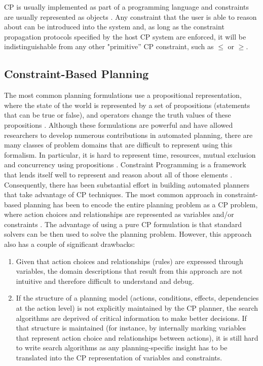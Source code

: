 {\textsf{CP} is usually implemented as part of a programming language
and constraints are usually represented as objects \cite{puget95}. Any
constraint that the user is able to reason about can be introduced
into the system and, as long as the constraint propagation protocols
specified by the host \textsf{CP} system are enforced, it will be
indistinguishable from any other "primitive'' \textsf{CP} constraint,
such as $\leq$ or $\geq$.

\subsection{Constraint-Based Planning}
\label{sec:europa:cp}

The most common planning formulations use a propositional
representation, where the state of the world is represented by a set
of propositions (statements that can be true or false), and operators
change the truth values of these propositions \cite{gen87}. Although
these formulations are powerful and have allowed researchers to
develop numerous contributions in automated planning, there are many
classes of problem domains that are difficult to represent using this
formalism. In particular, it is hard to represent time, resources,
mutual exclusion and concurrency using propositions \cite{ghallab04}.
Constraint Programming is a framework that lends itself well to
represent and reason about all of those elements \cite{ghallab94}.
Consequently, there has been substantial effort in building automated
planners that take advantage of \textsf{CP} techniques.  The most
common approach in constraint-based planning has been to encode the
entire planning problem as a \textsf{CP} problem, where action choices
and relationships are represented as variables and/or constraints
\cite{do01,vanbeek99,vossen99,wolfman99}.  The advantage of using a
pure \textsf{CP} formulation is that standard solvers can be then used
to solve the planning problem. However, this approach also has a
couple of significant drawbacks:

\begin{enumerate} 

\item Given that action choices and relationships (rules) are
  expressed through variables, the domain descriptions that result
  from this approach are not intuitive and therefore difficult to
  understand and debug.

\item If the structure of a planning model (actions, conditions,
  effects, dependencies at the action level) is not explicitly
  maintained by the \textsf{CP} planner, the search algorithms are deprived of
  critical information to make better decisions. If that structure is
  maintained (for instance, by internally marking variables that
  represent action choice and relationships between actions), it is
  still hard to write search algorithms as any planning-specific
  insight has to be translated into the \textsf{CP} representation of
  variables and constraints.
  

\end{enumerate}}
